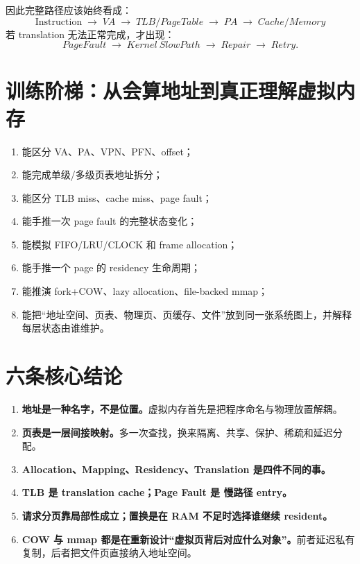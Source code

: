 \documentclass[11pt,a4paper]{ctexart}
\newcommand{\kw}[1]{\textbf{#1}}
\newcommand{\arr}{\;\longrightarrow\;}
\begin{document}
因此完整路径应该始终看成：
\[
\boxed{
\text{Instruction}
\arr VA
\arr TLB/PageTable
\arr PA
\arr Cache/Memory
}
\]
若 translation 无法正常完成，才出现：
\[
\boxed{PageFault\arr Kernel\ SlowPath\arr Repair\arr Retry.}
\]

\section{训练阶梯：从会算地址到真正理解虚拟内存}
\begin{enumerate}[label=\textbf{L\arabic*.}]
  \item 能区分 VA、PA、VPN、PFN、offset；
  \item 能完成单级/多级页表地址拆分；
  \item 能区分 TLB miss、cache miss、page fault；
  \item 能手推一次 page fault 的完整状态变化；
  \item 能模拟 FIFO/LRU/CLOCK 和 frame allocation；
  \item 能手推一个 page 的 residency 生命周期；
  \item 能推演 fork+COW、lazy allocation、file-backed mmap；
  \item 能把“地址空间、页表、物理页、页缓存、文件”放到同一张系统图上，并解释每层状态由谁维护。
\end{enumerate}

\section{六条核心结论}
\begin{corebox}[复原主干]
\begin{enumerate}
  \item \kw{地址是一种名字，不是位置。}虚拟内存首先是把程序命名与物理放置解耦。
  \item \kw{页表是一层间接映射。}多一次查找，换来隔离、共享、保护、稀疏和延迟分配。
  \item \kw{Allocation、Mapping、Residency、Translation 是四件不同的事。}
  \item \kw{TLB 是 translation cache；Page Fault 是 慢路径 entry。}
  \item \kw{请求分页靠局部性成立；置换是在 RAM 不足时选择谁继续 resident。}
  \item \kw{COW 与 mmap 都是在重新设计“虚拟页背后对应什么对象”。}前者延迟私有复制，后者把文件页直接纳入地址空间。
\end{enumerate}
\end{corebox}
\end{document}
